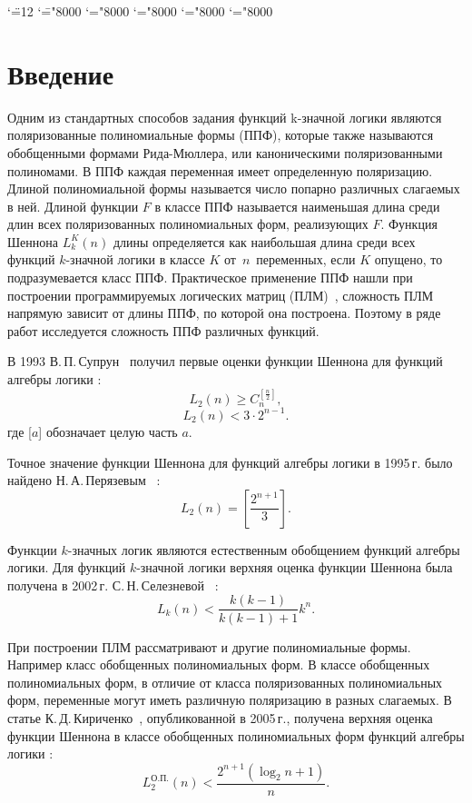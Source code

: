 \documentclass[bibliography=totoc, a4paper, 14pt]{extarticle}
\begin{document}
\begingroup \catcode`\"=12
\gdef\newmcodes@{\mathcode`\'39\mathcode`\*42\mathcode`\."613A%
\mathcode`\-"8000\mathcode`\/47\mathcode`\:"603A\relax}%
\endgroup
\mathcode`\=="8000 \mathcode`\+="8000 \mathcode`\-="8000
\mathcode`\<="8000 \mathcode`\>="8000



\setcounter{secnumdepth}{-1}

\section{Введение}
Одним из стандартных способов задания функций k\nobreakdash-значной логики являются поляризованные полиномиальные формы (ППФ),
которые также называются обобщенными формами Рида-Мюллера, или каноническими поляризованными полиномами. В ППФ каждая переменная
имеет определенную поляризацию. Длиной полиномиальной формы называется число попарно различных слагаемых в ней. Длиной функции
$F$ в классе ППФ называется наименьшая длина среди длин всех поляризованных полиномиальных форм, реализующих $F$.
Функция Шеннона $L^K_k(n)$ длины определяется как наибольшая длина среди всех функций $k$\nobreakdash-значной логики в классе $K$
от~$n$~переменных, если $K$ опущено, то подразумевается класс ППФ.
Практическое применение ППФ нашли при построении программируемых логических матриц (ПЛМ)~\cite{ue04, sb90}, сложность ПЛМ
напрямую зависит от длины ППФ, по которой она построена. Поэтому в ряде работ исследуется сложность ППФ различных функций.

В 1993  В.\,П.\,Супрун~\cite{sv93} получил первые оценки функции Шеннона для функций алгебры логики :
$$
L_2(n) \geqslant C_n^{[\frac{n}{2}]},
$$
$$
L_2(n) < 3 \cdot 2^{n-1}.
$$
где [$a$] обозначает целую часть $a$.

Точное значение функции Шеннона для функций алгебры логики в 1995\,г. было
найдено Н.\,А.\,Перязевым~\cite{pn95} :
$$
L_2(n) = \left[\frac{2^{n+1}}{3}\right].
$$

Функции $k$\nobreakdash-значных логик являются естественным обобщением функций алгебры логики.
Для функций $k$\nobreakdash-значной логики верхняя оценка функции Шеннона была получена в 2002\,г. С.\,Н.\,Селезневой~\cite{ss02} :
$$
L_k(n) < \frac{k(k-1)}{k(k-1)+1}k^n.
$$

При построении ПЛМ рассматривают и другие полиномиальные формы. Например класс обобщенных полиномиальных форм.
В классе обобщенных полиномиальных форм, в отличие от класса поляризованных полиномиальных форм, переменные могут иметь
различную поляризацию в разных слагаемых. В статье К.\,Д.\,Кириченко~\cite{kk05}, опубликованной в 2005\,г., получена верхняя оценка
функции Шеннона в классе обобщенных полиномиальных форм функций алгебры логики :
$$
L^{\text{О.П.}}_2(n) < \frac{2 ^ {n + 1}(\log_2n+1)}{n}.
$$
\end{document}
